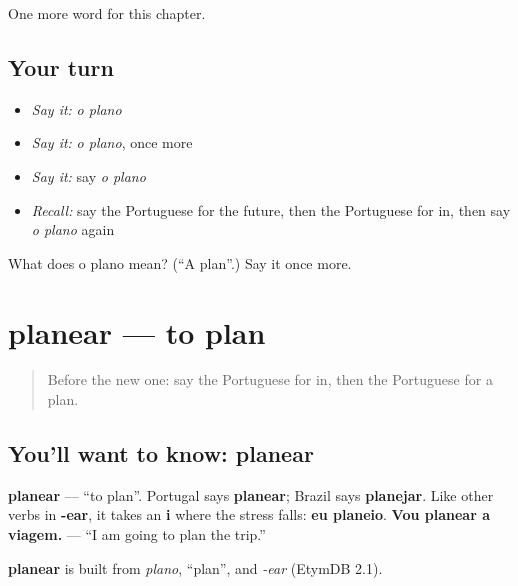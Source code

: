 \begin{grammarlens}[title={What you've built}]
One more word for this chapter.
\end{grammarlens}

\subsection*{Your turn}
\begin{itemize}
\raggedright
  \item \emph{Say it:} \emph{o plano}
  \item \emph{Say it:} \emph{o plano}, once more
  \item \emph{Say it:} say \emph{o plano}
  \item \emph{Recall:} say the Portuguese for the future, then the Portuguese for in, then say \emph{o plano} again
\end{itemize}

\begin{tcolorbox}[breakable,colback=teal!4,colframe=teal!35!black,title={Before you move on}]
What does o plano mean? (\textquotedblleft{}A plan\textquotedblright{}.) Say it once more.
\end{tcolorbox}
\section[planear]{planear — to plan}

\label{lesson:PT-C136-planear}



\begin{quote}
Before the new one: say the Portuguese for in, then the Portuguese for a plan.
\end{quote}

\subsection*{You'll want to know: planear}
\textbf{planear} — \textquotedblleft{}to plan\textquotedblright{}. Portugal says \textbf{planear}; Brazil says \textbf{planejar}. Like other verbs in \textbf{-ear}, it takes an \textbf{i} where the stress falls: \textbf{eu planeio}. \textbf{Vou planear a viagem.} — \textquotedblleft{}I am going to plan the trip.\textquotedblright{}

\begin{cousinweb}
\textbf{planear} is built from \emph{plano}, \textquotedblleft{}plan\textquotedblright{}, and \emph{-ear} (EtymDB 2.1).
\end{cousinweb}

